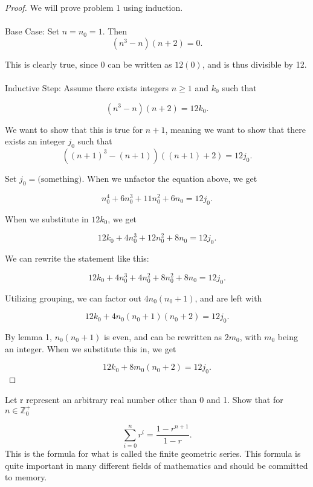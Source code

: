 \documentclass[12pt]{article}
\newenvironment{problem}[2][Problem]{\begin{trivlist}
\item[\hskip \labelsep {\bfseries #1}\hskip \labelsep {\bfseries #2.}]}{\end{trivlist}}
\begin{document}
\begin{proof} We will prove problem 1 using induction. \\ \\
    Base Case: Set $n = n_0 = 1$. Then
    $$(n^3 - n)(n + 2) = 0.$$

    This is clearly true, since 0 can be written as $12(0)$, and is thus divisible by 12. \\ \\

    Inductive Step: Assume there exists integers $n \geq 1$ and $k_0$ such that

    $$(n^3 - n)(n + 2) = 12k_0.$$

    We want to show that this is true for $n + 1$, meaning we want to show that there exists an integer $j_0$ such that
    $$((n+1)^3 - (n+1))((n+1) + 2) = 12j_0.$$

    Set $j_0 = \text{(something)}.$ When we unfactor the equation above, we get

    $$n_0^4 + 6n_0^3 + 11n_0^2 + 6n_0 = 12j_0.$$

    When we substitute in $12k_0$, we get 

    $$12k_0 + 4n_0^3 + 12n_0^2 + 8n_0 = 12j_0.$$

    We can rewrite the statement like this:

    $$12k_0 + 4n_0^3 + 4n_0^2 + 8n_0^2 + 8n_0 = 12j_0.$$

    Utilizing grouping, we can factor out $4n_0(n_0 + 1)$, and are left with

    $$12k_0 + 4n_0(n_0 + 1)(n_0 + 2) = 12j_0.$$

    By lemma 1, $n_0(n_0 + 1)$ is even, and can be rewritten as $2m_0$, with $m_0$ being an integer. When we substitute this in, we get

    $$12k_0 + 8m_0(n_0 + 2) = 12j_0.$$


\end{proof}





\newpage
\begin{problem}{2}
    Let r represent an arbitrary real number other than 0 and 1. Show that for $n \in \mathbb{Z}_0^+$

    $$\sum_{i=0}^{n} r^i = \frac{1 - r^{n+1}}{1 - r}.$$
    This is the formula for what is called the finite geometric series. This formula is quite important in many different fields of mathematics and should be committed to memory.

\end{problem}
\end{document}
